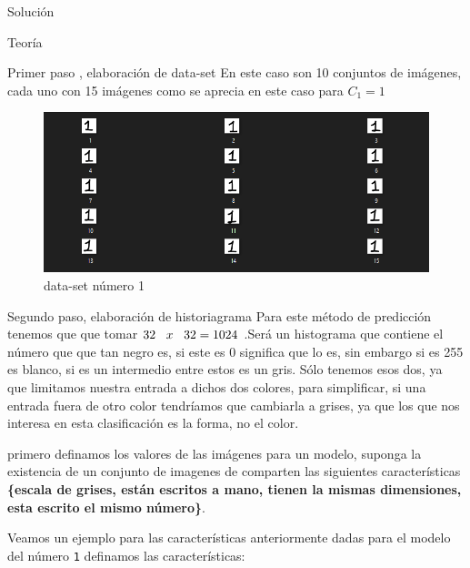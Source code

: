 \documentclass[
  spanish,
  ignorenonframetext,
]{beamer}
\begin{document}
\begin{frame}[fragile]{Solución}
\protect\hypertarget{soluciuxf3n}{}
\begin{block}{Teoría}
\protect\hypertarget{teoruxeda}{}
\begin{block}{Primer paso , elaboración de data-set}
\protect\hypertarget{primer-paso-elaboraciuxf3n-de-data-set}{}
En este caso son 10 conjuntos de imágenes, cada uno con 15 imágenes como
se aprecia en este caso para \(C_1=1\)

\begin{figure}
\centering
\includegraphics{img/README/image-20220506183750690.png}
\caption{data-set número 1}
\end{figure}
\end{block}

\begin{block}{Segundo paso, elaboración de historiagrama}
\protect\hypertarget{segundo-paso-elaboraciuxf3n-de-historiagrama}{}
Para este método de predicción tenemos que que tomar
\(32 \hspace{0.3cm}x \hspace{0.3cm} 32=1024\) .Será un histograma que
contiene el número que que tan negro es, si este es 0 significa que lo
es, sin embargo si es 255 es blanco, si es un intermedio entre estos es
un gris. Sólo tenemos esos dos, ya que limitamos nuestra entrada a
dichos dos colores, para simplificar, si una entrada fuera de otro color
tendríamos que cambiarla a grises, ya que los que nos interesa en esta
clasificación es la forma, no el color.

primero definamos los valores de las imágenes para un modelo, suponga la
existencia de un conjunto de imagenes de comparten las siguientes
características \textbf{\{escala de grises, están escritos a mano,
tienen la mismas dimensiones, esta escrito el mismo número\}}.

Veamos un ejemplo para las características anteriormente dadas para el
modelo del número \texttt{1} definamos las características:


\end{block}
\end{block}
\end{frame}
\end{document}
